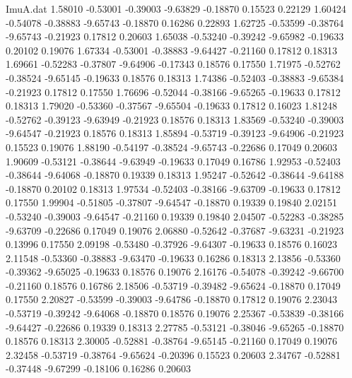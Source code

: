 \begin{filecontents}{ImuA.dat}
   1.58010   -0.53001   -0.39003   -9.63829   -0.18870    0.15523    0.22129
   1.60424   -0.54078   -0.38883   -9.65743   -0.18870    0.16286    0.22893
   1.62725   -0.53599   -0.38764   -9.65743   -0.21923    0.17812    0.20603
   1.65038   -0.53240   -0.39242   -9.65982   -0.19633    0.20102    0.19076
   1.67334   -0.53001   -0.38883   -9.64427   -0.21160    0.17812    0.18313
   1.69661   -0.52283   -0.37807   -9.64906   -0.17343    0.18576    0.17550
   1.71975   -0.52762   -0.38524   -9.65145   -0.19633    0.18576    0.18313
   1.74386   -0.52403   -0.38883   -9.65384   -0.21923    0.17812    0.17550
   1.76696   -0.52044   -0.38166   -9.65265   -0.19633    0.17812    0.18313
   1.79020   -0.53360   -0.37567   -9.65504   -0.19633    0.17812    0.16023
   1.81248   -0.52762   -0.39123   -9.63949   -0.21923    0.18576    0.18313
   1.83569   -0.53240   -0.39003   -9.64547   -0.21923    0.18576    0.18313
   1.85894   -0.53719   -0.39123   -9.64906   -0.21923    0.15523    0.19076
   1.88190   -0.54197   -0.38524   -9.65743   -0.22686    0.17049    0.20603
   1.90609   -0.53121   -0.38644   -9.63949   -0.19633    0.17049    0.16786
   1.92953   -0.52403   -0.38644   -9.64068   -0.18870    0.19339    0.18313
   1.95247   -0.52642   -0.38644   -9.64188   -0.18870    0.20102    0.18313
   1.97534   -0.52403   -0.38166   -9.63709   -0.19633    0.17812    0.17550
   1.99904   -0.51805   -0.37807   -9.64547   -0.18870    0.19339    0.19840
   2.02151   -0.53240   -0.39003   -9.64547   -0.21160    0.19339    0.19840
   2.04507   -0.52283   -0.38285   -9.63709   -0.22686    0.17049    0.19076
   2.06880   -0.52642   -0.37687   -9.63231   -0.21923    0.13996    0.17550
   2.09198   -0.53480   -0.37926   -9.64307   -0.19633    0.18576    0.16023
   2.11548   -0.53360   -0.38883   -9.63470   -0.19633    0.16286    0.18313
   2.13856   -0.53360   -0.39362   -9.65025   -0.19633    0.18576    0.19076
   2.16176   -0.54078   -0.39242   -9.66700   -0.21160    0.18576    0.16786
   2.18506   -0.53719   -0.39482   -9.65624   -0.18870    0.17049    0.17550
   2.20827   -0.53599   -0.39003   -9.64786   -0.18870    0.17812    0.19076
   2.23043   -0.53719   -0.39242   -9.64068   -0.18870    0.18576    0.19076
   2.25367   -0.53839   -0.38166   -9.64427   -0.22686    0.19339    0.18313
   2.27785   -0.53121   -0.38046   -9.65265   -0.18870    0.18576    0.18313
   2.30005   -0.52881   -0.38764   -9.65145   -0.21160    0.17049    0.19076
   2.32458   -0.53719   -0.38764   -9.65624   -0.20396    0.15523    0.20603
   2.34767   -0.52881   -0.37448   -9.67299   -0.18106    0.16286    0.20603

\end{filecontents}
